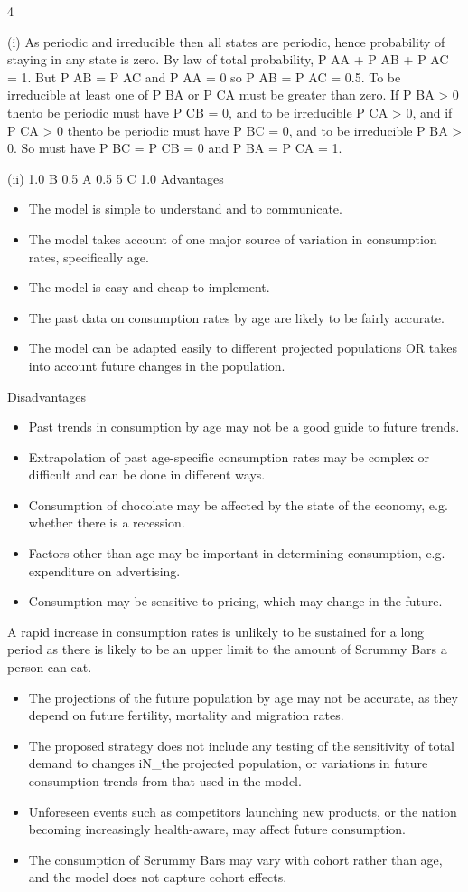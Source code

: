 \documentclass[a4paper,12pt]{article}
\begin{document}
4
\item (i)
As periodic and irreducible then all states are periodic, hence
probability of staying in any state is zero.
By law of total probability, P AA + P AB + P AC = 1.
But P AB = P AC and P AA = 0 so P AB = P AC = 0.5.
To be irreducible at least one of P BA or P CA must be greater than zero.
If P BA > 0 thento be periodic must have P CB = 0,
and to be irreducible P CA > 0,
and if P CA > 0 thento be periodic must have P BC = 0, and to be
irreducible P BA > 0.
So must have P BC = P CB = 0 and P BA = P CA = 1.
\item (ii)
1.0
B
0.5
A
0.5
5
C
1.0
Advantages
\begin{itemize}
\item The model is simple to understand and to communicate.
\item The model takes account of one major source of variation in consumption
rates, specifically age.
\item The model is easy and cheap to implement.
\item The past data on consumption rates by age are likely to be fairly accurate.
\item The model can be adapted easily to different projected populations OR takes
into account future changes in the population.
\end{itemize}
Disadvantages
\begin{itemize}
\item Past trends in consumption by age may not be a good guide to future trends.
\item Extrapolation of past age-specific consumption rates may be complex or
difficult and can be done in different ways.
\item Consumption of chocolate may be affected by the state of the economy,
e.g. whether there is a recession.
\item Factors other than age may be important in determining consumption,
e.g. expenditure on advertising.
\item Consumption may be sensitive to pricing, which may change in the future.
\end{itemize}
A rapid increase in consumption rates is unlikely to be sustained
for a long period as there is likely to be an upper limit to
the amount of Scrummy Bars a person can eat.
\begin{itemize}
\item The projections of the future population by age may not be accurate, as
they depend on future fertility, mortality and migration rates.
\item The proposed strategy does not include any testing of the sensitivity of total demand to changes iN_the projected population, or variations in future consumption trends from that used in the model.
\item Unforeseen events such as competitors launching new products, or the nation becoming increasingly health-aware, may affect future consumption.
\item The consumption of Scrummy Bars may vary with cohort rather than age, and
the model does not capture cohort effects.
\end{itemize}
\end{document}
